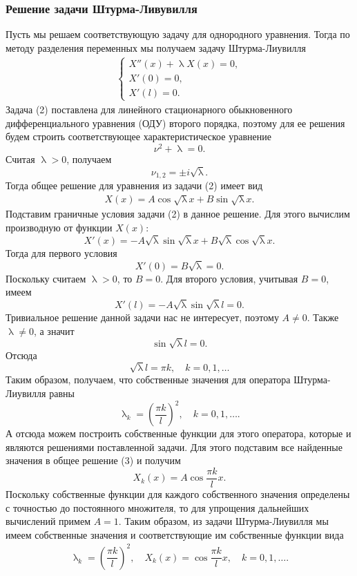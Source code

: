 \documentclass[a4paper, 12pt]{report}
\renewcommand{\lambda}{\uplambda}
\begin{document}
	\subsubsection*{Решение задачи Штурма-Ливувилля}
	Пусть мы решаем соответствующую задачу для однородного уравнения. Тогда по методу разделения переменных мы получаем задачу Штурма-Лиувилля \begin{eqnarray}
	\begin{cases}
	X''(x) + \lambda X(x) = 0,\\
	X'(0) = 0,\\
	X'(l) = 0.
	\end{cases}
	\end{eqnarray}
	Задача (2) поставлена для линейного стационарного обыкновенного дифференциального уравнения (ОДУ) второго порядка, поэтому для ее решения будем строить соответствующее характеристическое уравнение $$\nu^2 + \lambda = 0.$$
	Считая $\lambda >0$, получаем $$\nu_{1,2} = \pm i\sqrt \lambda.$$
	Тогда общее решение для уравнения из задачи (2) имеет вид 
	\begin{eqnarray}
		X(x) = A\cos \sqrt \lambda x + B \sin \sqrt \lambda x.
	\end{eqnarray}
	Подставим граничные условия задачи (2) в данное решение. Для этого вычислим производную от функции $X(x)$:
	$$X'(x) = -A\sqrt \lambda \sin \sqrt \lambda x + B \sqrt \lambda \cos \sqrt \lambda x.$$
	Тогда для первого условия 
	$$X'(0) = B\sqrt \lambda = 0.$$
	Поскольку считаем $\lambda > 0$, то $B = 0$. Для второго условия, учитывая $B = 0$, имеем
	$$X'(l) = -A\sqrt \lambda \sin \sqrt \lambda l = 0.$$
	Тривиальное решение данной задачи нас не интересует, поэтому $A \ne 0$. Также $\lambda \ne 0$, а значит $$\sin \sqrt \lambda l =0.$$
	Отсюда $$\sqrt \lambda l = \pi k, \quad k =0,1,\ldots$$
	Таким образом, получаем, что собственные значения для оператора Штурма-Лиувилля равны $$\lambda_k = \left(\dfrac{\pi k}{l}\right)^2,\quad k = 0,1,\ldots.$$
	А отсюда можем построить собственные функции для этого оператора, которые и являются решениями поставленной задачи. Для этого подставим все найденные значения в общее решение (3) и получим $$X_k(x) = A \cos \dfrac{\pi k}{l} x.$$
	Поскольку собственные функции для каждого собственного значения определены с точностью до постоянного множителя, то для упрощения дальнейших вычислений примем $A = 1$. Таким образом, из задачи Штурма-Лиувилля мы имеем собственные значения и соответствующие им собственные функции вида 
	\begin{eqnarray}
	\lambda_k = \left(\dfrac{\pi k}{l}\right)^2,\quad X_k(x) = \cos \dfrac{\pi k}{l} x,\quad k = 0,1,\ldots.
	\end{eqnarray}
\end{document}
